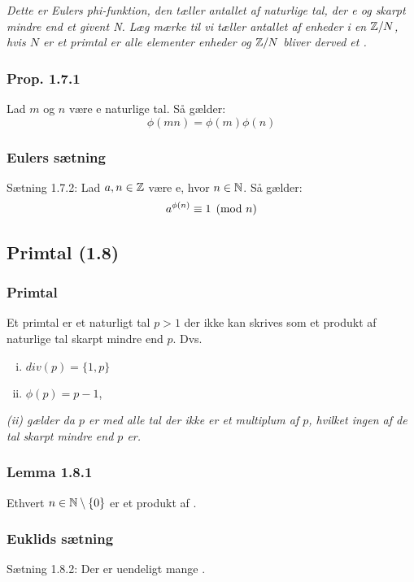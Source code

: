 \textit{Dette er Eulers phi-funktion, den tæller antallet af naturlige tal, der
e og skarpt mindre end et givent N. Læg mærke til vi
tæller antallet af enheder i en $\mathbb{Z}/ N$, hvis $N$ er et
primtal er alle elementer enheder og $\mathbb{Z}/ N$ bliver derved et .}

\subsubsection{Prop. 1.7.1}
Lad $m$ og $n$ være e naturlige tal. Så gælder:
\begin{equation*}
  \phi(mn) = \phi(m)\phi(n)
\end{equation*}

\subsubsection{Eulers sætning}
\label{Eulers saetning}
Sætning 1.7.2: Lad $a, n \in \mathbb{Z}$ være e, hvor $n \in
\mathbb{N}$. Så gælder:
\begin{equation*}
  a^{\phi(n)} \equiv 1 \pmod{n}
\end{equation*}


\subsection{Primtal (1.8)}
\subsubsection{Primtal}
\label{Primtal}
Et primtal er et naturligt tal $p > 1$ der ikke kan skrives som et produkt
af naturlige tal skarpt mindre end $p$. Dvs.
\begin{enumerate}[(i)]
  \item $div(p) = \{1, p\}$
  \item $\phi(p) = p -1$,
\end{enumerate}
\textit{(ii) gælder da $p$ er  med alle tal der ikke
er et multiplum af $p$, hvilket ingen af de tal skarpt mindre end $p$ er.}

\subsubsection{Lemma 1.8.1}
Ethvert $n \in \mathbb{N}\setminus \{0\}$ er et produkt af .

\subsubsection{Euklids sætning}
Sætning 1.8.2: Der er uendeligt mange .

